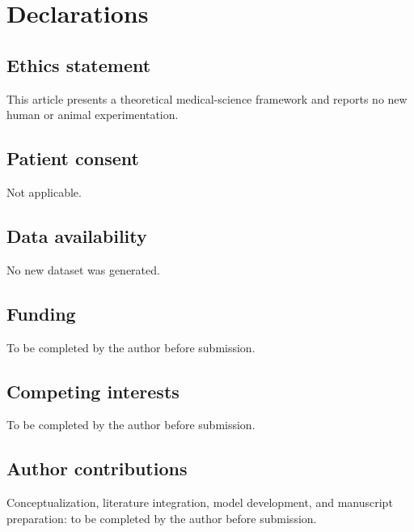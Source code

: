 \documentclass[9pt,twocolumn]{article}
\begin{document}
\section*{Declarations}
\subsection*{Ethics statement}
This article presents a theoretical medical-science framework and reports no new human or animal experimentation.

\subsection*{Patient consent}
Not applicable.

\subsection*{Data availability}
No new dataset was generated.

\subsection*{Funding}
To be completed by the author before submission.

\subsection*{Competing interests}
To be completed by the author before submission.

\subsection*{Author contributions}
Conceptualization, literature integration, model development, and manuscript preparation: to be completed by the author before submission.
\end{document}
